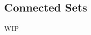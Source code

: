 \documentclass[../poma-notes.tex]{subfiles}
\begin{document}
\subsection*{Connected Sets}

WIP
\end{document}
